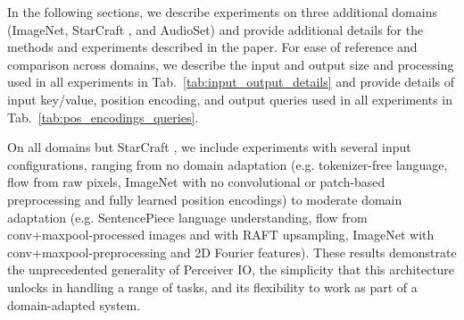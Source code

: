 \documentclass{article} \usepackage{iclr2022_conference,times}
\newcommand{\ourmodel}{Perceiver IO\xspace}
\begin{document}
In the following sections, we describe experiments on three additional domains (ImageNet, StarCraft , and AudioSet) and provide additional details for the methods and experiments described in the paper. For ease of reference and comparison across domains, we describe the input and output size and processing used in all experiments in Tab.~\ref{tab:input_output_details} and provide details of input key/value, position encoding, and output queries used in all experiments in Tab.~\ref{tab:pos_encodings_queries}. 

On all domains but StarCraft , we include experiments with several input configurations, ranging from no domain adaptation (e.g. tokenizer-free language, flow from raw pixels, ImageNet with no convolutional or patch-based preprocessing and fully learned position encodings) to moderate domain adaptation (e.g. SentencePiece language understanding, flow from conv+maxpool-processed images and with RAFT upsampling, ImageNet with conv+maxpool-preprocessing and 2D Fourier features). These results demonstrate the unprecedented generality of \ourmodel{}, the simplicity that this architecture unlocks in handling a range of tasks, and its flexibility to work as part of a domain-adapted system. 
\end{document}
